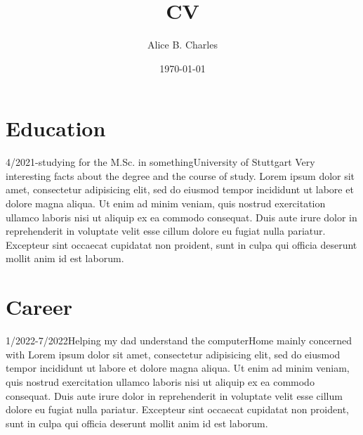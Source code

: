 \documentclass[english]{cv}
\title{CV}
\author{Alice B. Charles}
\date{\today}
\begin{document}
\maketitle

\personinfo

\section*{Education}

\begin{cvitem}{4/2021-}{studying for the M.Sc. in something}{University of Stuttgart}
	Very interesting facts about the degree and the course of study.
	Lorem ipsum dolor sit amet, consectetur adipisicing elit, sed do eiusmod
	tempor incididunt ut labore et dolore magna aliqua. Ut enim ad minim veniam,
	quis nostrud exercitation ullamco laboris nisi ut aliquip ex ea commodo
	consequat. Duis aute irure dolor in reprehenderit in voluptate velit esse
	cillum dolore eu fugiat nulla pariatur. Excepteur sint occaecat cupidatat non
	proident, sunt in culpa qui officia deserunt mollit anim id est laborum.
\end{cvitem}


\section*{Career}

\begin{cvitem}{1/2022-7/2022}{Helping my dad understand the computer}{Home}
	mainly concerned with Lorem ipsum dolor sit amet, consectetur adipisicing elit, sed do eiusmod
	tempor incididunt ut labore et dolore magna aliqua. Ut enim ad minim veniam,
	quis nostrud exercitation ullamco laboris nisi ut aliquip ex ea commodo
	consequat. Duis aute irure dolor in reprehenderit in voluptate velit esse
	cillum dolore eu fugiat nulla pariatur. Excepteur sint occaecat cupidatat non
	proident, sunt in culpa qui officia deserunt mollit anim id est laborum.
\end{cvitem}


\sign
\end{document}
